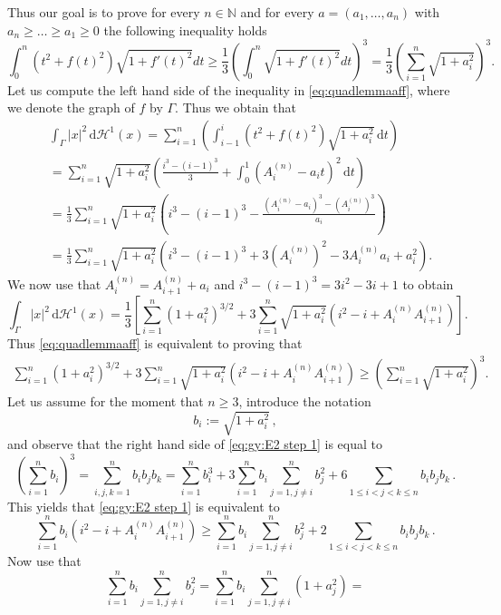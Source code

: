 \documentclass[10pt,leqno]{amsart}
\makeatletter
\newcommand{\N}[0]{\mathbb{N}}
\newcommand{\dd}{\, \mathrm{d}}
\newcommand{\dHo}{\, \mathrm{d} \mathcal{H}^{1}}
\numberwithin{Theorem}{section}
\theoremstyle{definition}
\theoremstyle{remark}
\numberwithin{equation}{section}
\numberwithin{equation}{section}
\newenvironment{customproof}[1]{%
  \par\pushQED{\qed}%
  \normalfont\topsep6pt \trivlist
  \item[\hskip\labelsep\itshape
    Proof of #1\@addpunct{.}]\ignorespaces
}{%
  \popQED\endtrivlist\@endpefalse
}
\makeatother
\begin{document}
\begin{customproof}{Theorem \ref{lm:quad_lemma_p=2}}
Thus our goal is to prove  for every $n \in \N$ and for every $a=(a_1, \dots, a_n)$ with $a_n \geq \dots \geq a_1 \geq 0$ the following inequality holds
\begin{equation} \label{eq:quadlemmaaff}
      \int_0^n (t^2+f(t)^2)\sqrt{1+f'(t)^2}dt
  \geq\frac{1}{3}\left(\int_0^n\sqrt{1+f'(t)^2}dt\right)^3
  =\frac{1}{3} \left( \sum_{i=1}^{n} \sqrt{1+a_i^2} \right)^3.
\end{equation}
Let us compute the left hand side of the inequality in \eqref{eq:quadlemmaaff}, where we denote the graph of $f$ by $\Gamma$. Thus we obtain that
\begin{align*}
     &\int_{\Gamma} |x|^2 \dHo(x) = \sum_{i=1}^{n} \left(\int_{i-1}^{i} \left( t^2 + f(t)^2 \right) \sqrt{1+a_i^2} \dd t \right) \\
     &=\sum_{i=1}^{n}  \sqrt{1+a_i^2} \left( \frac{i^3-(i-1)^3}{3} +  \int_0^{1} (A_i^{(n)}-a_i t)^2 \dd t \right) \\
     &= \frac{1}{3} \sum_{i=1}^{n}  \sqrt{1+a_i^2} \left( i^3-(i-1)^3 - \frac{(A_i^{(n)}-a_i)^3 -  (A_i^{(n)})^3  }{a_i}\right)  \\
     &= \frac{1}{3} \sum_{i=1}^{n}  \sqrt{1+a_i^2} \left( i^3-(i-1)^3 + 3(A_i^{(n)})^2-3A_i^{(n)}a_i+ a_i^2\right).
\end{align*}
We now use that $A_i^{(n)}=A_{i+1}^{(n)}+a_i$ and $i^3-(i-1)^3=3i^2-3i+1$ to obtain
$$
  \int_{\Gamma} |x|^2 \dHo(x)=\frac{1}{3}
  \left[\sum_{i=1}^n(1+a_i^2)^{3/2}+3\sum_{i=1}^n\sqrt{1+a_i^2}
  \left(i^2-i+A_i^{(n)}A_{i+1}^{(n)}\right)
  \right].
$$
Thus \eqref{eq:quadlemmaaff} is equivalent to proving that
\begin{align}\label{eq:gy:E2 step 1}
\sum_{i=1}^{n} (1+a_i^2)^{3/2}+3 \sum_{i=1}^{n} \sqrt{1+a_i^2}\left(i^2-i + A_i^{(n)} A_{i+1}^{(n)}\right) \geq  \left(\sum_{i=1}^{n} \sqrt{1+a_i^2}\right)^3.
\end{align}
Let us assume for the moment that $n\geq 3$, introduce the notation
$$
  b_i:=\sqrt{1+a_i^2}\,,
$$
and observe that the right hand side of \eqref{eq:gy:E2 step 1} is equal to
$$
  \left(\sum_{i=1}^n b_i\right)^3=\sum_{i,j,k=1}^n b_i b_j b_k
  =\sum_{i=1}^n b_i^3+3\sum_{i=1}^n b_i\sum_{j=1,j\neq i}^n b_j^2
  +6 \sum_{1 \leq i <j<k\leq n} b_i b_j b_k\,.
$$
This yields that \eqref{eq:gy:E2 step 1} is equivalent to
$$
  \sum_{i=1}^{n} b_i\left(i^2-i + A_i^{(n)} A_{i+1}^{(n)}\right) \geq
  \sum_{i=1}^n b_i\sum_{j=1,j\neq i}^n b_j^2
  +2 \sum_{1 \leq i <j<k\leq n} b_i b_j b_k\,.
$$
Now use that
$$
  \sum_{i=1}^n b_i\sum_{j=1,j\neq i}^n b_j^2=
  \sum_{i=1}^n b_i\sum_{j=1,j\neq i}^n (1+a_j^2)=
$$
\end{customproof}
\end{document}
